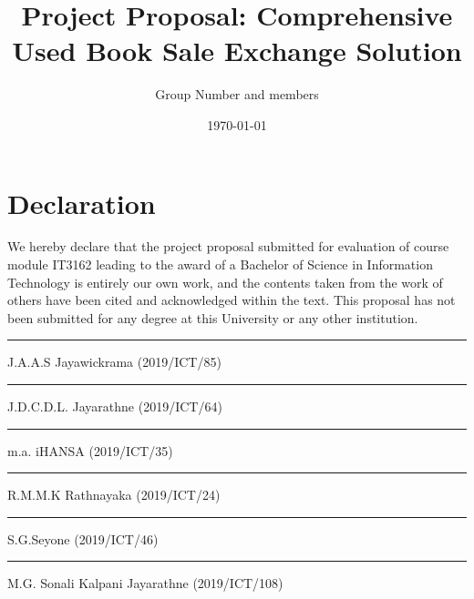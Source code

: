 \documentclass{article}
\begin{document}
\title{Project Proposal: Comprehensive Used Book Sale Exchange Solution}
\author{Group Number and members}
\date{ \today }
\maketitle

\newpage

\section*{Declaration}
We hereby declare that the project proposal submitted for evaluation of
course module IT3162 leading to the award of a Bachelor of Science in
Information Technology is entirely our own work, and the contents taken from
the work of others have been cited and acknowledged within the text. This
proposal has not been submitted for any degree at this University or any other
institution.

\vspace{2cm} %
\rule{5cm}{0.5pt} %
\linebreak
J.A.A.S Jayawickrama (2019/ICT/85)

\vspace{2cm} %
\rule{5cm}{0.5pt} %
\linebreak
J.D.C.D.L. Jayarathne (2019/ICT/64)

\vspace{2cm} %
\rule{5cm}{0.5pt} %
\linebreak
m.a. iHANSA (2019/ICT/35)

\vspace{2cm} %
\rule{5cm}{0.5pt} %
\linebreak
R.M.M.K Rathnayaka (2019/ICT/24)

\vspace{2cm} %
\rule{5cm}{0.5pt} %
\linebreak
S.G.Seyone (2019/ICT/46)

\vspace{2cm} %
\rule{5cm}{0.5pt} %
\linebreak
M.G. Sonali Kalpani Jayarathne (2019/ICT/108)
\end{document}
